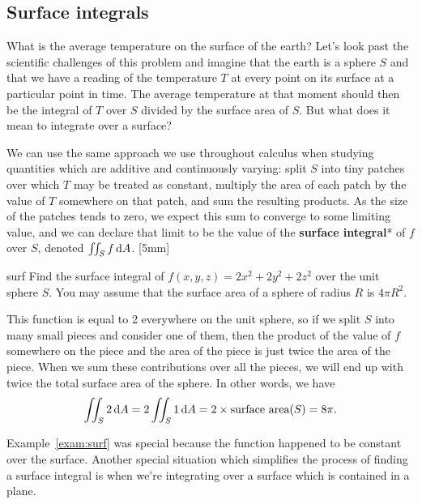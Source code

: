 \documentclass{watsonbook}
\begin{document}
\subsection{Surface integrals}


What is the average temperature on the surface of the earth? Let's
look past the scientific challenges of this problem and imagine that
the earth is a sphere $S$ and that we have a reading of the
temperature $T$ at every point on its surface at a particular point in
time. The average temperature at that moment should then be the
integral of $T$ over $S$ divided by the surface area of $S$. But what
does it mean to integrate over a surface?

We can use the same approach we use throughout calculus when studying
quantities which are additive and continuously varying: split $S$ into
tiny patches over which $T$ may be treated as constant, multiply the
area of each patch by the value of $T$ somewhere on that patch, and
sum the resulting products. As the size of the patches tends to zero,
we expect this sum to converge to some limiting value, and we can
declare that limit to be the value of the \textbf{surface integral}*
of $f$ over $S$, denoted $\iint_S f \, {\mathrm{d}}A$. [5mm]

\begin{example}{}{surf}
  Find the surface integral of $f(x,y,z) = 2x^2 +2y^2 + 2z^2$ over the
  unit sphere $S$. You may assume that the surface area of a sphere of
  radius $R$ is $4\pi R^2$. 
\end{example}

\begin{solution}
  This function is equal to 2 everywhere on the unit sphere, so if we
  split $S$ into many small pieces and consider one of them, then the
  product of the value of $f$ somewhere on the piece and the area of
  the piece is just twice the area of the piece. When we sum these
  contributions over all the pieces, we will end up with twice the
  total surface area of the sphere. In other words, we have
  \[
    \iint_{S} 2 \,\mathrm{d} A =     2 \iint_{S} 1 \,\mathrm{d} A = 2 \times \text{surface
      area}(S) = 8\pi. 
  \]
\end{solution}

Example~\ref{exam:surf} was special because the function happened to
be constant over the surface. Another special situation which
simplifies the process of finding a surface integral is when
we're integrating over a surface which is contained in a plane. 
\end{document}
